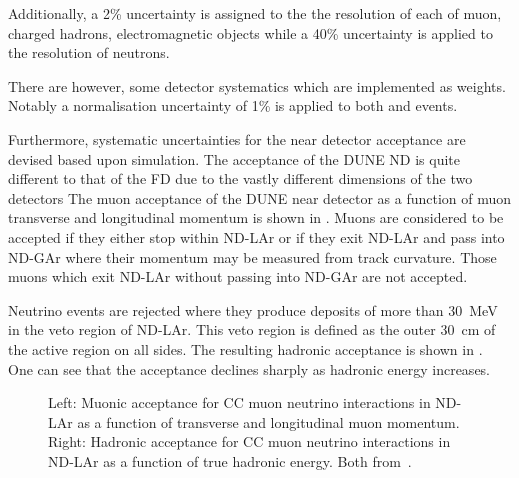 Additionally, a 2\% uncertainty is assigned to the the resolution of each of muon, charged hadrons, electromagnetic objects while a 40\% uncertainty is applied to the resolution of neutrons.

There are however, some detector systematics which are implemented as weights. 
Notably a normalisation uncertainty of 1\% is applied to both \numu and \nue events.

Furthermore, systematic uncertainties for the near detector acceptance are devised based upon simulation.
The acceptance of the DUNE ND is quite different to that of the FD due to the vastly different dimensions of the two detectors
The muon acceptance of the DUNE near detector as a function of muon transverse and longitudinal momentum is shown in . 
Muons are considered to be accepted if they either stop within ND-LAr or if they exit ND-LAr and pass into ND-GAr where their momentum may be measured from track curvature.
Those muons which exit ND-LAr without passing into ND-GAr are not accepted.

Neutrino events are rejected where they produce deposits of more than \SI{30}{\MeV} in the veto region of ND-LAr.
This veto region is defined as the outer \SI{30}{\cm} of the active region on all sides.
The resulting hadronic acceptance is shown in .
One can see that the acceptance declines sharply as hadronic energy increases.

\begin{figure}[h]
	\begin{minipage}[t]{.5\textwidth}
		\begin{adjustbox}{max totalsize=\linewidth, center}
			
		\end{adjustbox}
	\end{minipage}
	\hfill
	\begin{minipage}[t]{.5\textwidth}
		\begin{adjustbox}{max totalsize=\linewidth, center}
			
		\end{adjustbox}
	\end{minipage}
	\caption[Muonic and hadronic acceptance for CC neutrino interactions in ND-LAr]{Left: Muonic acceptance for CC muon neutrino interactions in ND-LAr as a function of transverse and longitudinal muon momentum. Right: Hadronic acceptance for CC muon neutrino interactions in ND-LAr as a function of true hadronic energy. Both from~\cite{Abi:2020qib}.}
	\label{fig:ndAcceptance}
\end{figure}

